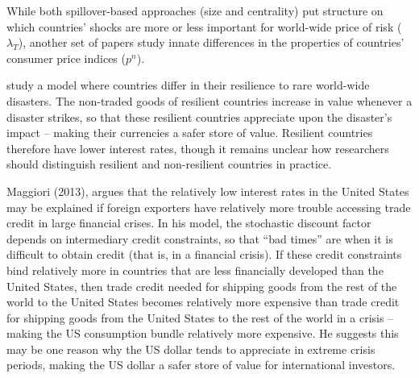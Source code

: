 \documentclass{ar-1col}
\begin{document}
While both spillover-based approaches (size and centrality) put structure on which countries' shocks are more or less important for world-wide price of risk ($\lambda_T$), another set of papers study innate differences in the properties of countries' consumer price indices ($p^n$).

\citet{FarhiGabaix2016} study a model where countries differ in their resilience to rare world-wide disasters. The non-traded goods of resilient countries increase in value whenever a disaster strikes, so that these resilient countries appreciate upon the disaster's impact -- making their currencies a safer store of value. Resilient countries therefore have lower interest rates, though it remains unclear how researchers should distinguish resilient and non-resilient countries in practice.

Maggiori (2013), argues that the relatively low interest rates in the United States may be explained if foreign exporters have relatively more trouble accessing trade credit in large financial crises. In his model, the stochastic discount factor depends on intermediary credit constraints, so that ``bad times'' are when it is difficult to obtain credit (that is, in a financial crisis). If these credit constraints bind relatively more in countries that are less financially developed than the United States, then trade credit needed for shipping goods from the rest of the world to the United States becomes relatively more expensive than trade credit for shipping goods from the United States to the rest of the world in a crisis -- making the US consumption bundle relatively more expensive. He suggests this may be one reason why the US dollar tends to appreciate in extreme crisis periods, making the US dollar a safer store of value for international investors.
\end{document}
